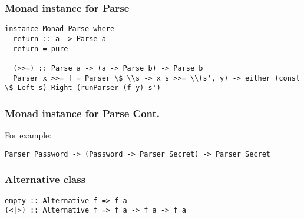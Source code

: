 \documentclass{beamer}
\begin{document}
\begin{frame}
\frametitle{Monad instance for Parse}


\begin{lstlisting}[frame=single]
instance Monad Parse where
  return :: a -> Parse a
  return = pure

  (>>=) :: Parse a -> (a -> Parse b) -> Parse b
  Parser x >>= f = Parser \$ \\s -> x s >>= \\(s', y) -> either (const \$ Left s) Right (runParser (f y) s')
\end{lstlisting}

\end{frame}


\begin{frame}
\frametitle{Monad instance for Parse Cont.}
For example:

\begin{lstlisting}[frame=single]
Parser Password -> (Password -> Parser Secret) -> Parser Secret
\end{lstlisting}

%
%
%
%
\end{frame}


\begin{frame}
\frametitle{Alternative class}
%
%

\begin{lstlisting}[frame=single]
empty :: Alternative f => f a
(<|>) :: Alternative f => f a -> f a -> f a
\end{lstlisting}


%
\end{frame}
\end{document}
